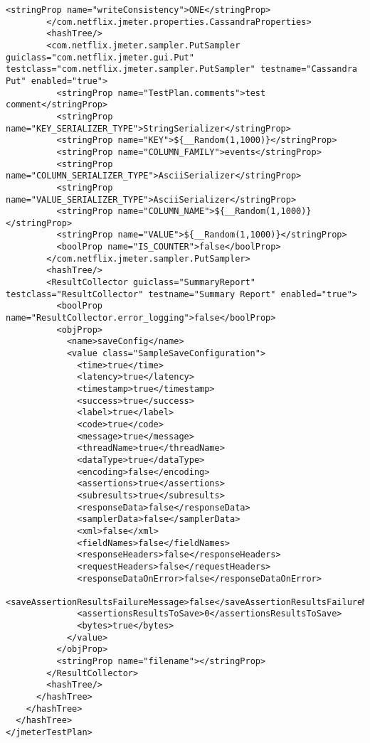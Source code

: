 \begin{lstlisting}[style=xml]
          <stringProp name="writeConsistency">ONE</stringProp>
        </com.netflix.jmeter.properties.CassandraProperties>
        <hashTree/>
        <com.netflix.jmeter.sampler.PutSampler guiclass="com.netflix.jmeter.gui.Put" testclass="com.netflix.jmeter.sampler.PutSampler" testname="Cassandra Put" enabled="true">
          <stringProp name="TestPlan.comments">test comment</stringProp>
          <stringProp name="KEY_SERIALIZER_TYPE">StringSerializer</stringProp>
          <stringProp name="KEY">${__Random(1,1000)}</stringProp>
          <stringProp name="COLUMN_FAMILY">events</stringProp>
          <stringProp name="COLUMN_SERIALIZER_TYPE">AsciiSerializer</stringProp>
          <stringProp name="VALUE_SERIALIZER_TYPE">AsciiSerializer</stringProp>
          <stringProp name="COLUMN_NAME">${__Random(1,1000)}</stringProp>
          <stringProp name="VALUE">${__Random(1,1000)}</stringProp>
          <boolProp name="IS_COUNTER">false</boolProp>
        </com.netflix.jmeter.sampler.PutSampler>
        <hashTree/>
        <ResultCollector guiclass="SummaryReport" testclass="ResultCollector" testname="Summary Report" enabled="true">
          <boolProp name="ResultCollector.error_logging">false</boolProp>
          <objProp>
            <name>saveConfig</name>
            <value class="SampleSaveConfiguration">
              <time>true</time>
              <latency>true</latency>
              <timestamp>true</timestamp>
              <success>true</success>
              <label>true</label>
              <code>true</code>
              <message>true</message>
              <threadName>true</threadName>
              <dataType>true</dataType>
              <encoding>false</encoding>
              <assertions>true</assertions>
              <subresults>true</subresults>
              <responseData>false</responseData>
              <samplerData>false</samplerData>
              <xml>false</xml>
              <fieldNames>false</fieldNames>
              <responseHeaders>false</responseHeaders>
              <requestHeaders>false</requestHeaders>
              <responseDataOnError>false</responseDataOnError>
              <saveAssertionResultsFailureMessage>false</saveAssertionResultsFailureMessage>
              <assertionsResultsToSave>0</assertionsResultsToSave>
              <bytes>true</bytes>
            </value>
          </objProp>
          <stringProp name="filename"></stringProp>
        </ResultCollector>
        <hashTree/>
      </hashTree>
    </hashTree>
  </hashTree>
</jmeterTestPlan>

\end{lstlisting}